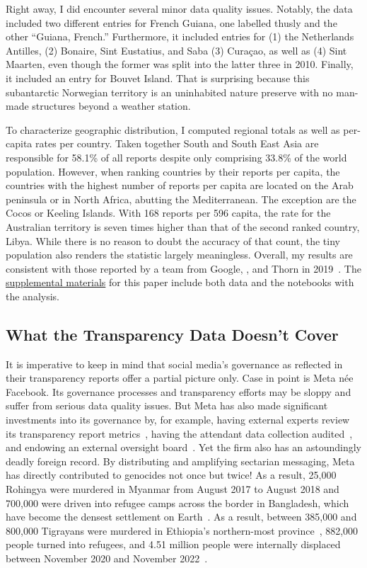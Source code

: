 Right away, I did encounter several minor data quality issues. Notably, the data
included two different entries for French Guiana, one labelled thusly and the
other ``Guiana, French.'' Furthermore, it included entries for (1) the
Netherlands Antilles, (2) Bonaire, Sint Eustatius, and Saba (3) Curaçao, as well
as (4) Sint Maarten, even though the former was split into the latter three in
2010. Finally, it included an entry for Bouvet Island. That is surprising
because this subantarctic Norwegian territory is an uninhabited nature preserve
with no man-made structures beyond a weather station.

To characterize geographic distribution, I computed regional totals as well as
per-capita rates per country. Taken together South and South East Asia are
responsible for 58.1\% of all reports despite only comprising 33.8\% of the
world population. However, when ranking countries by their reports per capita,
the countries with the highest number of reports per capita are located on the
Arab peninsula or in North Africa, abutting the Mediterranean. The exception are
the Cocos or Keeling Islands. With 168 reports per 596 capita, the rate for the
Australian territory is seven times higher than that of the second ranked
country, Libya. While there is no reason to doubt the accuracy of that count,
the tiny population also renders the statistic largely meaningless. Overall, my
results are consistent with those reported by a team from Google, \NCMEC, and
Thorn in 2019~\cite{BurszteinBrightea2019}. The
\href{https://github.com/apparebit/penal-colony}{supplemental materials} for
this paper include both data and the notebooks with the analysis.


\subsection{What the Transparency Data Doesn't Cover}
\label{sec:census-limits}

It is imperative to keep in mind that social media's governance as reflected in
their transparency reports offer a partial picture only. Case in point is Meta
n\'ee Facebook. Its governance processes and transparency efforts may be sloppy
and suffer from serious data quality issues. But Meta has also made significant
investments into its governance by, for example, having external experts review
its transparency report metrics~\cite{BradfordGriselea2019}, having the
attendant data collection audited~\cite{Sarang2022}, and endowing an external
oversight board~\cite{BoteroMarinoGreeneea2020}. Yet the firm also has an
astoundingly deadly foreign record. By distributing and amplifying sectarian
messaging, Meta has directly contributed to genocides not once but twice! As a
result, 25,000 Rohingya were murdered in Myanmar from August 2017 to August 2018
and 700,000 were driven into refugee camps across the border in Bangladesh,
which have become the densest settlement on
Earth~\cite{DeGuzman2022,HumanRightsCouncil2018}. As a result, between 385,000
and 800,000 Tigrayans were murdered in Ethiopia's northern-most
province~\cite{AnnysVandenBemptea2021,ChothiaBekit2022}, 882,000 people turned
into refugees, and 4.51 million people were internally displaced between
November 2020 and November 2022~\cite{UNICEF2023}.


